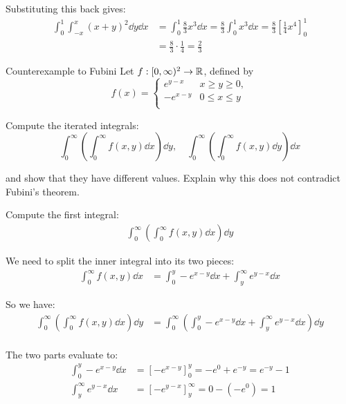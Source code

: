 \documentclass[12pt]{article}
\begin{document}
\begin{enumerate}
    Substituting this back gives:
    $$
    \begin{aligned}
        \int_{0}^{1} \int_{-x}^{x} (x + y)^2 \dd y \dd x &= \int_{0}^{1} \frac{8}{3}x^3 \dd x = \frac{8}{3} \int_{0}^{1} x^3 \dd x = \frac{8}{3} \left[ \frac{1}{4} x^4 \right]_0^1 \\
        &= \frac{8}{3} \cdot \frac{1}{4} = \boxed{\frac{2}{3}}
    \end{aligned}
    $$
\end{enumerate}

\begin{problem}{Counterexample to Fubini}{}
    Let $f: [0, \infty)^2 \rightarrow \mathbb{R}$, defined by 
    $$
        f(x) =
        \begin{cases}
            e^{y-x} & x \geq y \geq 0, \\
            -e^{x-y} & 0 \leq x \leq y \\
        \end{cases}
    $$

    Compute the iterated integrals:
    $$
        \int_{0}^{\infty} \left( \int_{0}^{\infty} f(x, y) \dd x \right) \dd y,\quad \int_{0}^{\infty} \left( \int_{0}^{\infty} f(x, y) \dd y \right) \dd x
    $$

    and show that they have different values. Explain why this does not contradict Fubini's theorem.
\end{problem}

Compute the first integral:
$$
\begin{aligned}
    \int_{0}^{\infty} \left( \int_{0}^{\infty} f(x, y) \dd x \right) \dd y
\end{aligned}    
$$

We need to split the inner integral into its two pieces:
$$
\begin{aligned}
    \int_{0}^{\infty} f(x, y) \dd x &= \int_{0}^{y} -e^{x-y} \dd x + \int_{y}^{\infty} e^{y-x} \dd x
\end{aligned}  
$$

So we have:
$$
\begin{aligned}
    \int_{0}^{\infty} \left( \int_{0}^{\infty} f(x, y) \dd x \right) \dd y &= \int_{0}^{\infty} \left( \int_{0}^{y} -e^{x-y} \dd x + \int_{y}^{\infty} e^{y-x} \dd x \right) \dd y \\
\end{aligned}    
$$

The two parts evaluate to:
$$
\begin{aligned}
    \int_{0}^{y} -e^{x-y} \dd x &= \left[-e^{x-y}\right]_0^y = -e^{0} + e^{-y} = e^{-y} - 1 \\
    \int_{y}^{\infty} e^{y-x} \dd x &=  \left[ -e^{y-x} \right]_y^\infty = 0 - (-e^{0}) = 1
\end{aligned}
$$
\end{document}
